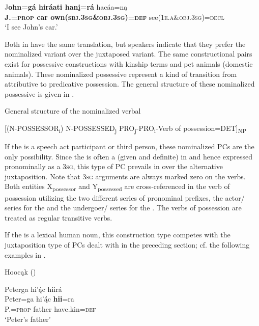 \documentclass[output=paper]{LSP/langsci}
\begin{document}
\ex 
\gll J\textbf{ohn=g\'a hir\'aati han\k{i}=r\'a} hac\'aa=n\k{a}  \\
\textbf{J.=\textsc{prop} car own(\textsc{sbj.3sg}\&\textsc{obj.3sg})=\textsc{def}} see(\textsc{1e.a}\&\textsc{obj.3sg})=\textsc{decl}  \\
\glt `I see John's car.'
\z
\z 

Both  in  have the same translation, but speakers indicate that they prefer the nominalized variant over the juxtaposed variant. The same constructional pairs exist for possessive constructions with kinship terms and pet animals (domestic animals). These nominalized possessive  represent a kind of transition from attributive to predicative possession. The general structure of these nominalized possessive  is given in .

\ea General structure of the nominalized verbal  \label{generalstructure}

[(N-POSSESSOR\textsubscript{i})  N-POSSESSED\textsubscript{j}    PRO\textsubscript{j}-PRO\textsubscript{i}-Verb of possession=DET]\textsubscript{NP}
\z

If the  is a speech act participant or third person, these nominalized PCs are the only possibility. Since the  is often a  (given and definite) in  and hence expressed pronominally as a \textsc{3sg}, this type of PC prevails in  over the alternative juxtaposition. Note that \textsc{3sg} arguments are always marked zero on the verbs. Both entities X\textsubscript{possessor} and Y\textsubscript{possessed} are cross-referenced in the verb of possession utilizing the two different series of pronominal prefixes, the actor/ series for the  and the undergoer/ series for the . The verbs of possession are treated as regular transitive verbs.

If the  is a lexical human noun, this construction type competes with the juxtaposition type of PCs dealt with in the preceding section; cf. the following examples in .
 
\ea {}Hoocąk (\citealt[16]{Helmbrecht2003}) \label{petersthings}

\ea 
\glll Peterga hi'ą́c hiirá \\
Peter=ga        hi’ą́́c   \textbf{hii}=ra \\
P.=\textsc{prop}  father have.kin=\textsc{def} \\
\glt `Peter's father'
\end{document}
